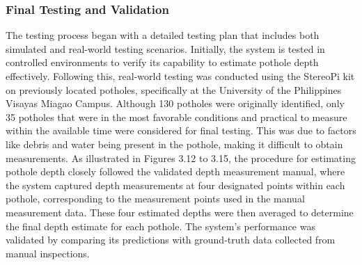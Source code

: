 \subsubsection{Final Testing and Validation}
The testing process began with a detailed testing plan that includes both simulated and real-world testing scenarios. Initially, the system is tested in controlled environments to verify its capability to estimate pothole depth effectively. Following this, real-world testing was conducted using the StereoPi kit on previously located potholes, specifically at the University of the Philippines Visayas Miagao Campus. Although 130 potholes were originally identified, only 35 potholes that were in the most favorable conditions and practical to measure within the available time were considered for final testing. This was due to factors like debris and water being present in the pothole, making it difficult to obtain measurements. As illustrated in Figures 3.12 to 3.15, the procedure for estimating pothole depth closely followed the validated depth measurement manual, where the system captured depth measurements at four designated points within each pothole, corresponding to the measurement points used in the manual measurement data. These four estimated depths were then averaged to determine the final depth estimate for each pothole. The system’s performance was validated by comparing its predictions with ground-truth data collected from manual inspections.

